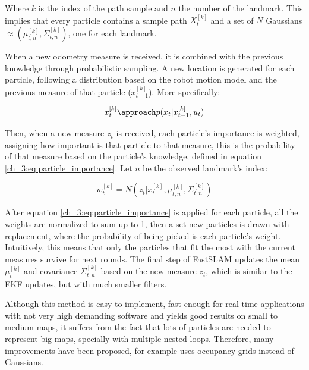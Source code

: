       Where $k$ is the index of the path sample and $n$ the number of the landmark. This implies that every particle contains a sample path $X_{t}^{[k]}$ and a set of $N$ Gaussians $\approx (\mu_{t,n}^{[k]}, \Sigma_{t,n}^{[k]})$, one for each landmark.

      When a new odometry measure is received, it is combined with the previous knowledge through probabilistic sampling. A new location is generated for each particle, following a distribution based on the robot motion model and the previous measure of that particle ($x_{t-1}^{[k]}$). More specifically:

      \begin{equation} \label{ch_3:eq:particle_update}
        x_{t}^{[k]} \approach p(x_{t} | x_{t-1}^{[k]}, u_{t})
      \end{equation}

      Then, when a new measure $z_{t}$ is received, each particle's importance is weighted, assigning how important is that particle to that measure, this is the probability of that measure based on the particle's knowledge, defined in equation \ref{ch_3:eq:particle_importance}. Let $n$ be the observed landmark's index:

      \begin{equation} \label{ch_3:eq:particle_importance}
        w_{t}^{[k]} = N(z_{t} | x_{t}^{[k]}, \mu_{t,n}^{[k]}, \Sigma_{t,n}^{[k]})
      \end{equation}

      After equation \ref{ch_3:eq:particle_importance} is applied for each particle, all the weights are normalized to sum up to 1, then a set new particles is drawn with replacement, where the probability of being picked is each particle's weight. Intuitively, this means that only the particles that fit the most with the current measures survive for next rounds. The final step of FastSLAM updates the mean $\mu_{t}^{[k]}$ and covariance $\Sigma_{t,n}^{[k]}$ based on the new measure $z_{t}$, which is similar to the EKF updates, but with much smaller filters.

      Although this method is easy to implement, fast enough for real time applications with not very high demanding software and yields good results on small to medium maps, it suffers from the fact that lots of particles are needed to represent big maps, specially with multiple nested loops. Therefore, many improvements have been proposed, \cite{Grisetti2007} for example uses occupancy grids instead of Gaussians.

